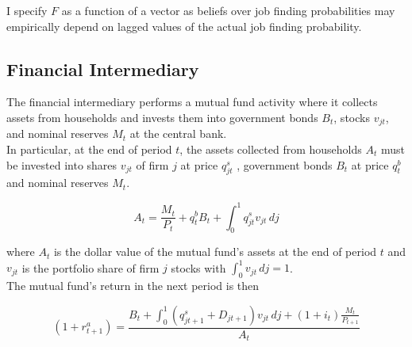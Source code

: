 \documentclass[titlepage]{\econtex}\providecommand{\texname}{Dissertation-Proposal}
\begin{document}
I specify $F$ as a function of a vector as beliefs over job finding probabilities may empirically depend on lagged values of the actual job finding probability.\\

\begin{comment}
Combining the transition equations, the recursive nature of
the problem allows us to rewrite it more compactly in Bellman equation form,
\begin{eqnarray*}
\VFunc_{t}(\mLevBF_{t},\pLevBF_{t}) & = & \max_{\cLevBF_{t}}~\left\{\util(\cLevBF_{t})+\DiscFac \Ex_{t}\left[ \VFunc_{t+1}((\mLevBF_{t}-\cLevBF_{t})\Rfree+ \pLevBF_{t+1}\tShkAll_{t+1},\pLevBF_{t} \PGro  \pShk_{t+1})\right]\right\}
.
\end{eqnarray*}
\end{comment} 

\hypertarget{Financial Intermediary}{}
\subsection{Financial Intermediary}

\label{subsec:Financial Intermediary}

The financial intermediary performs a mutual fund activity where it collects assets from households and invests them into government bonds $B_{t}$, stocks $v_{jt}$, and nominal reserves $M_{t}$ at the central bank.\\ 

In particular, at the end of period $t$, the assets collected from households $A_{t}$ must be invested into shares $\mathit{v}_{jt}$ of firm $j$ at price  $q^{s}_{jt}$ , government bonds $B_{t}$ at price $q^{b}_{t}$ and nominal reserves $M_{t}$. 

\begin{equation} A_{t} = \frac{M_{t}}{P_{t}} +q^{b}_{t} B_{t} + \int_{0}^{1} q^{s}_{jt}\mathit{v}_{jt}\,dj \end{equation}

where $A_{t} $ is the dollar value of the mutual fund's assets at the end of period $t$ and $ \mathit{v}_{jt}$ is the portfolio share of firm $j$ stocks with $\int_{0}^{1} \mathit{v}_{jt}\,dj =1$.  \\

The mutual fund's return in the next period is then 

$$(1+r^{a}_{t+1})  = \frac{  B_{t} + \int_{0}^{1} (q^{s}_{jt+1}+ D_{jt+1})\mathit{v}_{jt} \, dj +(1+i_{t}) \frac{M_{t}}{P_{t+1}}}{A_{t}}$$\\ 
\end{document}
